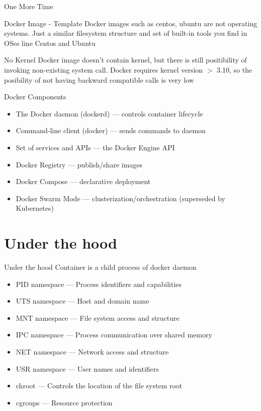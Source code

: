 \begin{frame}{One More Time}
  \begin{block}{Docker Image - Template}
  Docker images such as centos, ubuntu are not operating systems. Just a similar filesystem structure and set of built-in tools you find in OSes line Centos and Ubuntu
  \end{block}

  \begin{exampleblock}{No Kernel}
  Docker image doesn't contain kernel, but there is still positibility of invoking non-existing system call. Docker requires kernel version $>$ 3.10, so the posibility of not having backward compatible calls is very low
  \end{exampleblock}
\end{frame}

\begin{frame}{Docker Components}  
  \begin{itemize}
    \item The Docker daemon (dockerd) --- controls container lifecycle    
    \item Command-line client (docker) --- sends commands to daemon
    \item Set of services and APIs --- the Docker Engine API
    \item Docker Registry --- publish/share images
    \item Docker Compose --- declarative deployment
    \item Docker Swarm Mode --- clusterization/orchestration (superseded by Kubernetes)
  \end{itemize}
\end{frame}

\section{Under the hood}

\begin{frame}{Under the hood}
  Container is a child process of docker daemon
  \begin{itemize}
    \item PID namespace --- Process identifiers and capabilities
    \item UTS namespace --- Host and domain name
    \item MNT namespace --- File system access and structure
    \item IPC namespace --- Process communication over shared memory
    \item NET namespace --- Network access and structure
    \item USR namespace --- User names and identifiers
    \item chroot        --- Controls the location of the file system root
    \item cgroups       --- Resource protection
  \end{itemize}
\end{frame}


